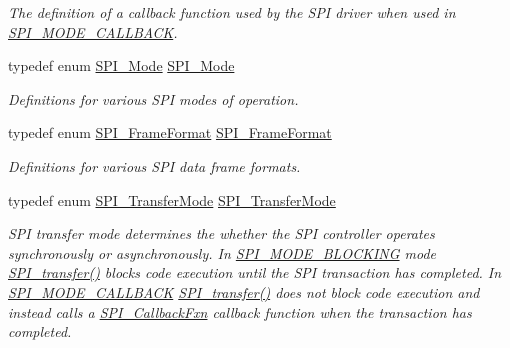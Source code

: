\begin{DoxyCompactItemize}
\begin{DoxyCompactList}\small\item\em The definition of a callback function used by the S\+P\+I driver when used in \hyperlink{_s_p_i_8h_ab9ea76c6529d6076eee5e1c4a5a92c6fa5631e69925c47a62a261c78ebbda39fb}{S\+P\+I\+\_\+\+M\+O\+D\+E\+\_\+\+C\+A\+L\+L\+B\+A\+C\+K}. \end{DoxyCompactList}\item 
typedef enum \hyperlink{_s_p_i_8h_a60a7e3d74577b38aa79ea6983362f942}{S\+P\+I\+\_\+\+Mode} \hyperlink{_s_p_i_8h_aa336fc399a0b2b1b5442f8a1e169984f}{S\+P\+I\+\_\+\+Mode}
\begin{DoxyCompactList}\small\item\em Definitions for various S\+P\+I modes of operation. \end{DoxyCompactList}\item 
typedef enum \hyperlink{_s_p_i_8h_a4e1f33555dfa8147205af5b266f3a489}{S\+P\+I\+\_\+\+Frame\+Format} \hyperlink{_s_p_i_8h_a53949638d43ae7bf71b74c2b136ad206}{S\+P\+I\+\_\+\+Frame\+Format}
\begin{DoxyCompactList}\small\item\em Definitions for various S\+P\+I data frame formats. \end{DoxyCompactList}\item 
typedef enum \hyperlink{_s_p_i_8h_ab9ea76c6529d6076eee5e1c4a5a92c6f}{S\+P\+I\+\_\+\+Transfer\+Mode} \hyperlink{_s_p_i_8h_a03fe641fa0950b2fe6c1b596cc5c235b}{S\+P\+I\+\_\+\+Transfer\+Mode}
\begin{DoxyCompactList}\small\item\em S\+P\+I transfer mode determines the whether the S\+P\+I controller operates synchronously or asynchronously. In \hyperlink{_s_p_i_8h_ab9ea76c6529d6076eee5e1c4a5a92c6fa0dfb2358e008316426895e7237c398e8}{S\+P\+I\+\_\+\+M\+O\+D\+E\+\_\+\+B\+L\+O\+C\+K\+I\+N\+G} mode \hyperlink{_s_p_i_8h_a989e17f96b54fcc3dc2cac5f8ac6bdb2}{S\+P\+I\+\_\+transfer()} blocks code execution until the S\+P\+I transaction has completed. In \hyperlink{_s_p_i_8h_ab9ea76c6529d6076eee5e1c4a5a92c6fa5631e69925c47a62a261c78ebbda39fb}{S\+P\+I\+\_\+\+M\+O\+D\+E\+\_\+\+C\+A\+L\+L\+B\+A\+C\+K} \hyperlink{_s_p_i_8h_a989e17f96b54fcc3dc2cac5f8ac6bdb2}{S\+P\+I\+\_\+transfer()} does not block code execution and instead calls a \hyperlink{_s_p_i_8h_a207e2d5a7e7ea5606b6995b6485ca015}{S\+P\+I\+\_\+\+Callback\+Fxn} callback function when the transaction has completed. \end{DoxyCompactList}\item 

\end{DoxyCompactItemize}
